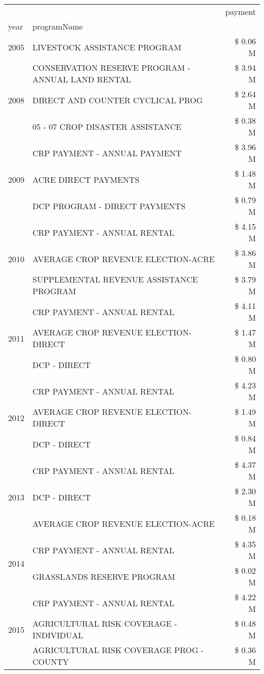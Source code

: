 \begin{tabular}{llr}
\toprule
 &  & payment \\
year & programName &  \\
\midrule
2005 & LIVESTOCK ASSISTANCE PROGRAM & \$ 0.06 M \\
\cline{1-3}
\multirow[t]{3}{*}{2008} & CONSERVATION RESERVE PROGRAM - ANNUAL LAND RENTAL & \$ 3.94 M \\
 & DIRECT AND COUNTER CYCLICAL PROG & \$ 2.64 M \\
 & 05 - 07 CROP DISASTER ASSISTANCE & \$ 0.38 M \\
\cline{1-3}
\multirow[t]{3}{*}{2009} & CRP PAYMENT - ANNUAL PAYMENT & \$ 3.96 M \\
 & ACRE DIRECT PAYMENTS & \$ 1.48 M \\
 & DCP PROGRAM - DIRECT PAYMENTS & \$ 0.79 M \\
\cline{1-3}
\multirow[t]{3}{*}{2010} & CRP PAYMENT - ANNUAL RENTAL & \$ 4.15 M \\
 & AVERAGE CROP REVENUE ELECTION-ACRE & \$ 3.86 M \\
 & SUPPLEMENTAL REVENUE ASSISTANCE PROGRAM & \$ 3.79 M \\
\cline{1-3}
\multirow[t]{3}{*}{2011} & CRP PAYMENT - ANNUAL RENTAL & \$ 4.11 M \\
 & AVERAGE CROP REVENUE ELECTION-DIRECT & \$ 1.47 M \\
 & DCP - DIRECT & \$ 0.80 M \\
\cline{1-3}
\multirow[t]{3}{*}{2012} & CRP PAYMENT - ANNUAL RENTAL & \$ 4.23 M \\
 & AVERAGE CROP REVENUE ELECTION-DIRECT & \$ 1.49 M \\
 & DCP - DIRECT & \$ 0.84 M \\
\cline{1-3}
\multirow[t]{3}{*}{2013} & CRP PAYMENT - ANNUAL RENTAL & \$ 4.37 M \\
 & DCP - DIRECT & \$ 2.30 M \\
 & AVERAGE CROP REVENUE ELECTION-ACRE & \$ 0.18 M \\
\cline{1-3}
\multirow[t]{2}{*}{2014} & CRP PAYMENT - ANNUAL RENTAL & \$ 4.35 M \\
 & GRASSLANDS RESERVE PROGRAM & \$ 0.02 M \\
\cline{1-3}
\multirow[t]{3}{*}{2015} & CRP PAYMENT - ANNUAL RENTAL & \$ 4.22 M \\
 & AGRICULTURAL RISK COVERAGE - INDIVIDUAL & \$ 0.48 M \\
 & AGRICULTURAL RISK COVERAGE PROG - COUNTY & \$ 0.36 M \\

\end{tabular}
